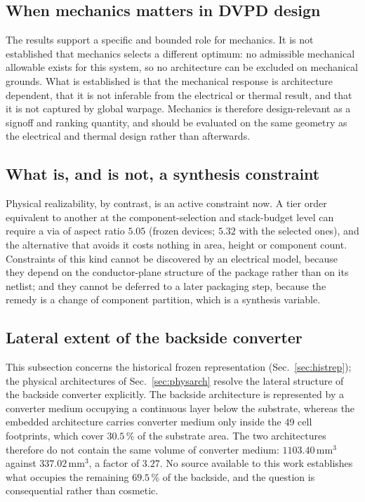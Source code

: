 \documentclass[journal]{IEEEtran}
\begin{document}
\subsection{When mechanics matters in DVPD design}
The results support a specific and bounded role for mechanics. It is not established that
mechanics selects a different optimum: no admissible mechanical allowable exists for this
system, so no architecture can be excluded on mechanical grounds. What is established is
that the mechanical response is architecture dependent, that it is not inferable from the
electrical or thermal result, and that it is not captured by global warpage. Mechanics is
therefore design-relevant as a signoff and ranking quantity, and should be evaluated on the
same geometry as the electrical and thermal design rather than afterwards.

\subsection{What is, and is not, a synthesis constraint}
Physical realizability, by contrast, is an active constraint now. A tier order equivalent to
another at the component-selection and stack-budget level can require a via of aspect ratio
$5.05$ (frozen devices; $5.32$ with the selected ones), and the alternative that avoids it
costs nothing in area, height or component count.
Constraints of this kind cannot be discovered by an electrical model, because they depend on
the conductor-plane structure of the package rather than on its netlist; and they cannot be
deferred to a later packaging step, because the remedy is a change of component partition,
which is a synthesis variable.

\subsection{Lateral extent of the backside converter}\label{sec:backside-limit}
This subsection concerns the historical frozen representation (Sec.~\ref{sec:histrep}); the physical architectures of Sec.~\ref{sec:physarch} resolve the lateral structure of the backside converter explicitly.
The backside architecture is represented by a converter medium occupying a continuous layer
below the substrate, whereas the embedded architecture carries converter medium only inside
the 49 cell footprints, which cover $30.5$\,\% of the substrate area. The two architectures
therefore do not contain the same volume of converter medium: $1103.40$\,mm$^{3}$ against
$337.02$\,mm$^{3}$, a factor of $3.27$. No source available to this work establishes what
occupies the remaining $69.5$\,\% of the backside, and the question is consequential rather
than cosmetic.
\end{document}

